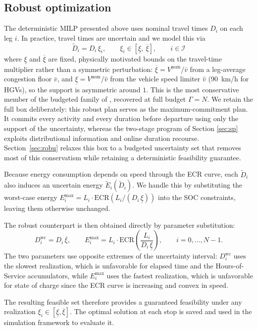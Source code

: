 \documentclass[preprint,12pt,3p]{elsarticle}
\begin{document}
\subsection{Robust optimization} \label{sec:ro}
The deterministic MILP presented above uses nominal travel times $D_i$ on each leg $i$. In practice, travel times are uncertain and we model this via
\[
  \tilde{D}_i = D_i \,\xi_i, \qquad \xi_i \in {[\underline\xi,\ \overline\xi]}, \qquad i \in \mathcal I
\]
where $\underline\xi$ and $\overline\xi$ are fixed, physically motivated bounds on the travel-time multiplier rather than a symmetric perturbation: $\overline\xi = V^{\mathrm{nom}}/\bar v$ from a leg-average congestion floor $\bar v$, and $\underline\xi = V^{\mathrm{nom}}/\hat v$ from the vehicle speed limiter $\hat v$ (90~km/h for HGVs), so the support is asymmetric around $1$. This is the most conservative member of the budgeted family of \citet{bertsimas_price_2004}, recovered at full budget $\Gamma = N$. We retain the full box deliberately: this robust plan serves as the maximum-commitment plan. It commits every activity and every duration before departure using only the support of the uncertainty, whereas the two-stage program of Section \ref{sec:sp} exploits distributional information and online duration recourse. Section~\ref{sec:robu} relaxes this box to a budgeted uncertainty set that removes most of this conservatism while retaining a deterministic feasibility guarantee.

Because energy consumption depends on speed through the ECR curve, each $\tilde{D}_i$ also induces an uncertain energy $\tilde{E}_i(\tilde{D}_i)$. We handle this  by substituting the worst-case energy $E_i^{\max} = L_i \cdot \mathrm{ECR}\!\left(L_i / (D_i\,{\underline\xi})\right)$ into the SOC constraints, leaving them otherwise unchanged.

 The robust counterpart is then obtained directly by parameter substitution:
\[
  D_i^{\mathrm{wc}} = D_i\,{\overline\xi}, \qquad
  E_i^{\max} = L_i \cdot \mathrm{ECR}\!\left(\frac{L_i}{D_i\,{\underline\xi}}\right),
  \qquad i = 0,\ldots,N-1.
\]
The two parameters use opposite extremes of the uncertainty interval: $D_i^{\mathrm{wc}}$ uses the slowest realization, which is unfavorable for elapsed time and the Hours-of-Service accumulators, while $E_i^{\max}$ uses the fastest realization, which is unfavorable for state of charge since the ECR curve is increasing and convex in speed.

The resulting feasible set therefore provides a guaranteed feasibility under any realization $\xi_i \in {[\underline\xi, \overline\xi]}$.
The optimal solution at each stop is saved and used in the simulation framework to evaluate it.
\end{document}
